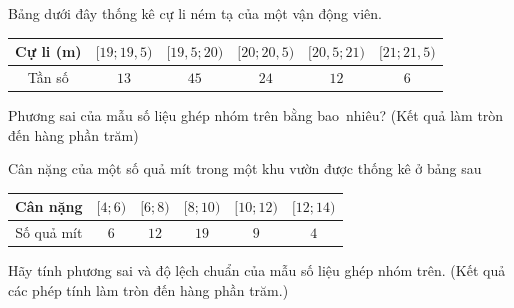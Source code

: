 \begin{bt}%
	Bảng dưới đây thống kê cự li ném tạ của một  vận động viên.
	\begin{center}
		\begin{tabular}{|c|c|c|c|c|c|}
			 \hline
			Cự li (m)  & $[19; 19{,}5)$ & $[19{,}5; 20)$ & $[20; 20{,}5)$ & $[20{,}5; 21)$ & $[21; 21{,}5)$ \\
			 \hline
			Tần số & $13$ & $45$ & $24$ & $12$ & $6$ \\ 
			\hline 
		\end{tabular}
	\end{center}
	Phương sai của mẫu số liệu  ghép nhóm trên bằng bao~nhiêu? (Kết quả làm tròn đến hàng phần trăm)
\end{bt}



\begin{bt}%
	Cân nặng của  một số quả mít trong một khu vườn được thống kê ở bảng sau
	\begin{longtable}{|c|c|c|c|c|c|}
		 \hline
		Cân  nặng & $[4;6)$ & $[6;8)$ & $[8;10)$ & $[10;12)$ & $[12;14)$\\
		 \hline
		Số quả  mít & $6$ & $12$ & $19$ & $9$ & $4$\\
		\hline 
	\end{longtable}
	\noindent Hãy tính phương sai và độ  lệch chuẩn của mẫu số liệu ghép nhóm trên. (Kết quả các phép tính làm tròn đến hàng phần trăm.)
\end{bt}

